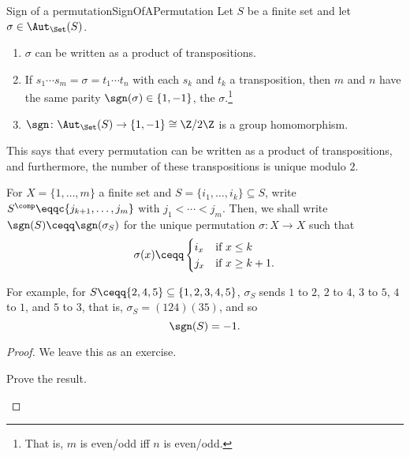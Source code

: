 \begin{thm}{Sign of a permutation}{SignOfAPermutation}
	Let $S$ be a finite set and let $\sigma \in \Aut _{\Set}(S)$.
	\begin{enumerate}
		\item $\sigma$ can be written as a product of transpositions.
		\item If $s_1\cdots s_m=\sigma =t_1\cdots t_n$ with each $s_k$ and $t_k$ a transposition, then $m$ and $n$ have the same parity $\sgn (\sigma )\in \{ 1,-1\}$\index[notation]{$\sgn (\sigma )$}, the  $\sigma$.\footnote{That is, $m$ is even/odd iff $n$ is even/odd.}
		\item $\sgn \colon \Aut _{\Set}(S)\rightarrow \{ 1,-1\} \cong \Z /2\Z$ is a group homomorphism.
	\end{enumerate}
	\begin{rmk}
		This says that every permutation can be written as a product of transpositions, and furthermore, the number of these transpositions is unique modulo $2$.
	\end{rmk}
	\begin{rmk}
		For $X=\{ 1,\ldots ,m\}$ a finite set and $S=\{ i_1,\ldots ,i_k\} \subseteq S$, write $S^{\comp}\eqqc \{ j_{k+1},\ldots ,j_m\}$ with $j_1<\cdots <j_m$.  Then, we shall write $\sgn (S)\ceqq \sgn (\sigma _S)$ for the unique permutation $\sigma \colon X\rightarrow X$ such that
		\begin{equation}
			\sigma (x)\ceqq \begin{cases}i_x & \text{if }x\leq k \\ j_x & \text{if }x\geq k+1\text{.}\end{cases}
		\end{equation}
		
		For example, for $S\ceqq \{ 2,4,5\} \subseteq \{ 1,2,3,4,5\}$, $\sigma _S$ sends $1$ to $2$, $2$ to $4$, $3$ to $5$, $4$ to $1$, and $5$ to $3$, that is, $\sigma _S=(124)(35)$, and so
		\begin{equation}
			\sgn (S)=-1.
		\end{equation}
	\end{rmk}
	\begin{proof}
		We leave this as an exercise.
		\begin{exr}[breakable=false]{}{}
			Prove the result.
		\end{exr}
	\end{proof}
\end{thm}

